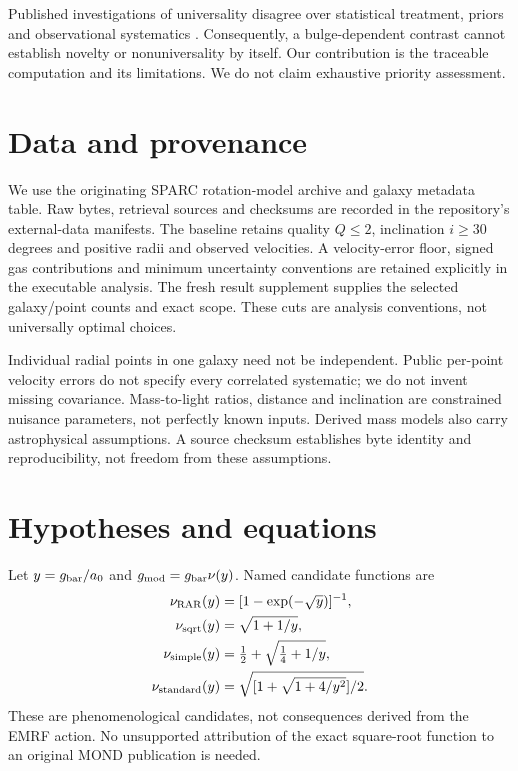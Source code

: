 \documentclass[11pt]{article}
\begin{document}
Published investigations of universality disagree over statistical treatment, priors and observational systematics \cite{li2018,rodrigues2018,kroupa2018,rodriguesreply2018}. Consequently, a bulge-dependent contrast cannot establish novelty or nonuniversality by itself. Our contribution is the traceable computation and its limitations. We do not claim exhaustive priority assessment.

\section{Data and provenance}
We use the originating SPARC rotation-model archive and galaxy metadata table. Raw bytes, retrieval sources and checksums are recorded in the repository's external-data manifests. The baseline retains quality $Q\leq2$, inclination $i\geq30$ degrees and positive radii and observed velocities. A velocity-error floor, signed gas contributions and minimum uncertainty conventions are retained explicitly in the executable analysis. The fresh result supplement supplies the selected galaxy/point counts and exact scope. These cuts are analysis conventions, not universally optimal choices.

Individual radial points in one galaxy need not be independent. Public per-point velocity errors do not specify every correlated systematic; we do not invent missing covariance. Mass-to-light ratios, distance and inclination are constrained nuisance parameters, not perfectly known inputs. Derived mass models also carry astrophysical assumptions. A source checksum establishes byte identity and reproducibility, not freedom from these assumptions.

\section{Hypotheses and equations}
Let $y=g_{\rm bar}/a_0$ and $g_{\rm mod}=g_{\rm bar}\nu(y)$. Named candidate functions are
\begin{align}
\nu_{\rm RAR}(y)&=[1-\exp(-\sqrt y)]^{-1},\\
\nu_{\rm sqrt}(y)&=\sqrt{1+1/y},\\
\nu_{\rm simple}(y)&=\tfrac12+\sqrt{\tfrac14+1/y},\\
\nu_{\rm standard}(y)&=\sqrt{[1+\sqrt{1+4/y^2}]/2}.
\end{align}
These are phenomenological candidates, not consequences derived from the EMRF action. No unsupported attribution of the exact square-root function to an original MOND publication is needed.
\end{document}
